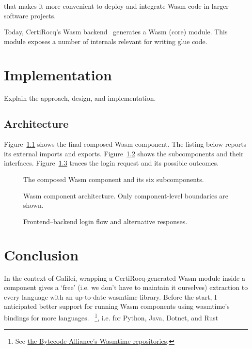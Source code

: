 \documentclass[12pt,a4paper]{report}
\begin{document}
that makes it more convenient to deploy and integrate Wasm code in larger software projects.


Today, CertiRocq's Wasm backend~\cite{certicoqwasm-cpp2025} generates a Wasm (core) module. This module exposes a number of internals relevant for writing glue code.


\chapter{Implementation}
Explain the approach, design, and implementation.

\section{Architecture}
Figure~\ref{fig:composed-component} shows the final composed Wasm component.
The listing below reports its external imports and exports.
Figure~\ref{fig:architecture} shows the subcomponents and their interfaces.
Figure~\ref{fig:login-flow} traces the login request and its possible
outcomes.

\begin{figure}[!ht]
\centering

\caption{The composed Wasm component and its six subcomponents.}
\label{fig:composed-component}
\end{figure}
\par\bigskip

\clearpage

\begin{figure}[p]
\centering
\resizebox{0.94\linewidth}{!}{}
\caption{Wasm component architecture. Only component-level boundaries are shown.}
\label{fig:architecture}
\end{figure}
\clearpage

\begin{landscape}
\begin{figure}[p]
\centering
\resizebox{0.85\linewidth}{!}{}
\caption{Frontend--backend login flow and alternative responses.}
\label{fig:login-flow}
\end{figure}
\end{landscape}

\chapter{Conclusion}
In the context of Galilei, wrapping a CertiRocq-generated Wasm module inside a component gives a `free' (i.e. we don't have to maintain it ourselves)
extraction to every language with an up-to-date wasmtime library. 
Before the start, I anticipated better support for running Wasm components using wasmtime's bindings for more languages.
 ~\footnote{See \href{https://github.com/orgs/bytecodealliance/repositories?q=wasmtime-}{the Bytecode Alliance's Wasmtime repositories}.}, i.e. for Python, Java, Dotnet, and Rust

\printbibliography[heading=bibintoc]
\end{document}
